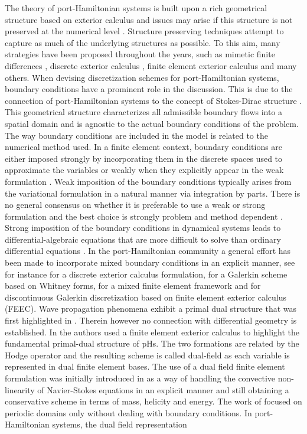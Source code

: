 \documentclass[11pt,a4paper]{article}
\begin{document}
The theory of port-Hamiltonian systems is built upon a rich geometrical structure based on exterior calculus and issues may arise if this structure is not preserved at the numerical level \cite{bochev2003discourse,arnold2006finite,christiansen2011topics}. Structure preserving techniques attempt to capture as much of the underlying structures as possible. To this aim, many strategies have been proposed throughout the years, such as mimetic finite differences \cite{bochev2006principles,lipnikov2014}, discrete exterior calculus \cite{hirani2003discrete}, finite element exterior calculus \cite{arnold2006finite} and many others. When devising discretization schemes for port-Hamiltonian systems, boundary conditions have a prominent role in the discussion. This is due to the connection of port-Hamiltonian systems to the concept of Stokes-Dirac structure \cite{van2002hamiltonian}. This geometrical structure characterizes all admissible boundary flows into a spatial domain and is agnostic to the actual boundary conditions of the problem. The way boundary conditions are included in the model is related to the numerical method used. In a finite element context, boundary conditions are either imposed strongly by incorporating them in the discrete spaces used to approximate the variables or weakly when they explicitly appear in the weak formulation \cite{quarteroni2008numerical}. Weak imposition of the boundary conditions typically arises from the variational formulation in a natural manner via integration by parts. There is no general consensus on whether it is preferable to use a weak or strong formulation and the best choice is strongly problem and method dependent \cite{bazilevs2007,eriksson2022}. Strong imposition of the boundary conditions in dynamical systems leads to differential-algebraic equations that are more difficult to solve than ordinary differential equations \cite{kunkel2006differential}. In the port-Hamiltonian community a general effort has been made to incorporate mixed boundary conditions in an explicit manner, see for instance \cite{seslija2014explicit} for a discrete exterior calculus formulation, \cite{kotyczka2018weak} for a Galerkin scheme based on Whitney forms, \cite{cardoso2020pfem} for a mixed finite element framework and  \cite{kumar2024dg} for discontinuous Galerkin discretization based on finite element exterior calculus (FEEC). Wave propagation phenomena exhibit a primal dual structure that was first highlighted in \cite{joly2003}. Therein however no connection with differential geometry is established.  In \cite{Brugnoli2022DualCalculus} the authors used a finite element exterior calculus to highlight the fundamental primal-dual structure of pHs. The two formations are related by the Hodge operator and the resulting scheme is called dual-field as each variable is represented in dual finite element bases. The use of a dual field finite element formulation was initially introduced in \cite{Zhang2022ADomains} as a way of handling the convective non-linearity of Navier-Stokes equations in an explicit manner and still obtaining a conservative scheme in terms of mass, helicity and energy. The work of \cite{Zhang2022ADomains} focused on periodic domains only without dealing with boundary conditions. In port-Hamiltonian systems, the dual field representation 
\end{document}
